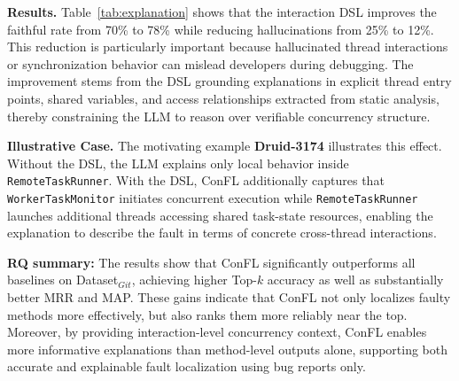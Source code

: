 \noindent\textbf{Results.}
Table~\ref{tab:explanation} shows that the interaction DSL improves the faithful rate from 70\% to 78\% while reducing hallucinations from 25\% to 12\%. This reduction is particularly important because hallucinated thread interactions or synchronization behavior can mislead developers during debugging. The improvement stems from the DSL grounding explanations in explicit thread entry points, shared variables, and access relationships extracted from static analysis, thereby constraining the LLM to reason over verifiable concurrency structure.

\noindent\textbf{Illustrative Case.}
The motivating example \textbf{Druid-3174} illustrates this effect. Without the DSL, the LLM explains only local behavior inside \texttt{RemoteTaskRunner}. With the DSL, ConFL additionally captures that \texttt{WorkerTaskMonitor} initiates concurrent execution while \texttt{RemoteTaskRunner} launches additional threads accessing shared task-state resources, enabling the explanation to describe the fault in terms of concrete cross-thread interactions.

\vspace{-0.5em}
\vspace*{3pt}
\begin{tcolorbox}
{\bf RQ\thefindingsCounter{} summary:} {
The results show that ConFL significantly outperforms all baselines on Dataset$_{Git}$, achieving higher Top-$k$ accuracy as well as substantially better MRR and MAP.
These gains indicate that ConFL not only localizes faulty methods more effectively, but also ranks them more reliably near the top.
Moreover, by providing interaction-level concurrency context, ConFL enables more informative explanations than method-level outputs alone, supporting both accurate and explainable fault localization using bug reports only.
}
\end{tcolorbox}

